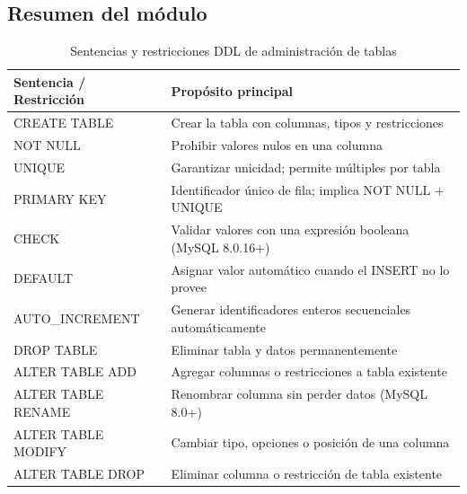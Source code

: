 \subsection*{Resumen del módulo}

\begin{table}[H]
  \centering
  \caption{Sentencias y restricciones DDL de administración de tablas}
  \renewcommand{\arraystretch}{1.3}
  \begin{tabularx}{\textwidth}{>{\ttfamily}l X}
    \toprule
    \textbf{Sentencia / Restricción} & \textbf{Propósito principal}                                    \\
    \midrule
    CREATE TABLE        & Crear la tabla con columnas, tipos y restricciones              \\
    NOT NULL            & Prohibir valores nulos en una columna                           \\
    UNIQUE              & Garantizar unicidad; permite múltiples por tabla                \\
    PRIMARY KEY         & Identificador único de fila; implica NOT NULL + UNIQUE          \\
    CHECK               & Validar valores con una expresión booleana (MySQL 8.0.16+)      \\
    DEFAULT             & Asignar valor automático cuando el INSERT no lo provee          \\
    AUTO\_INCREMENT     & Generar identificadores enteros secuenciales automáticamente    \\
    DROP TABLE          & Eliminar tabla y datos permanentemente                          \\
    ALTER TABLE ADD     & Agregar columnas o restricciones a tabla existente              \\
    ALTER TABLE RENAME  & Renombrar columna sin perder datos (MySQL 8.0+)                 \\
    ALTER TABLE MODIFY  & Cambiar tipo, opciones o posición de una columna                \\
    ALTER TABLE DROP    & Eliminar columna o restricción de tabla existente               \\
    \bottomrule
  \end{tabularx}
\end{table}